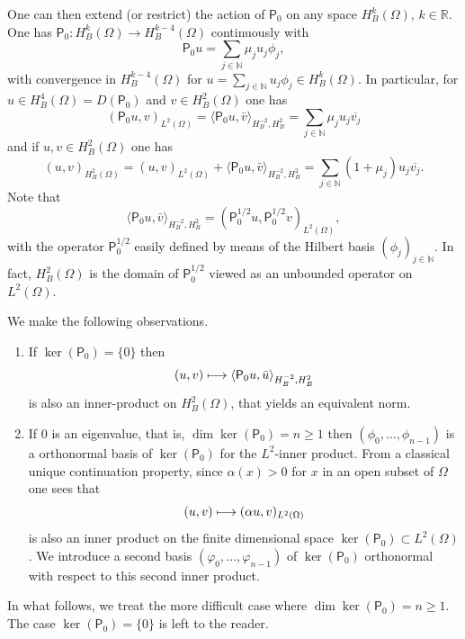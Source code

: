 \documentclass[10pt]{amsart}
\newcommand\mto{\mathchoice{\longmapsto}{\mapsto}{\mapsto}{\mapsto}}
\theoremstyle{plain}
\theoremstyle{definition}
\def\R{\mathbb{R}}
\def\N{\mathbb{N}}
\newcommand{\ovl}[1]{\overline{#1}}
\newcommand{\inp}[2]{(#1, #2)}
\newcommand{\dup}[2]{\langle #1 , #2 \rangle}
\newcommand{\Pell}{\mathsf P_0}
\begin{document}
One can then extend (or restrict) the action of $\Pell$ on any space
$H^k_B(\Omega)$, $k \in \R$. One has $\Pell: H^k_B(\Omega) \to
H^{k-4}_B(\Omega)$ continuously with
\begin{equation}
\label{eq: action P}
\Pell u = \sum_{j\in \N}\mu_j u_j \phi_j,
\end{equation}
with convergence in $H^{k-4}_B(\Omega)$ for $u = \sum_{j\in \N}u_j \phi_j
\in H^k_B(\Omega)$.
In particular, for $u \in H^4_B(\Omega)= D(\Pell)$ and $v \in H^{2}_B(\Omega)$
one has
\begin{equation}
\label{eq: pseudo-norm}
\inp{\Pell u }{v}_{L^2(\Omega)} = \dup{\Pell u }{\bar{v}}_{H^{-2}_B,
H^{2}_B}
= \sum_{j \in \N} \mu_j u_j \ovl{v_j}
\end{equation}
and if $u,v \in H^{2}_B(\Omega)$ one has
\begin{equation}
\label{eq: norm H2B}
\inp{u}{v}_{H^{2}_B(\Omega)} = \inp{u }{v}_{L^2(\Omega)}
+ \dup{\Pell u }{\bar{v}}_{H^{-2}_B, H^{2}_B}
= \sum_{j \in \N} (1+\mu_j) u_j \ovl{v_j}.
\end{equation}
Note that
\begin{equation}
\label{eq: norm H2B-bis}
\dup{\Pell u }{\bar{v}}_{H^{-2}_B, H^{2}_B}
= \inp{\Pell^{1/2} u}{\Pell^{1/2} v}_{L^2(\Omega)},
\end{equation}
with the operator $\Pell^{1/2}$ easily defined by means of the Hilbert
basis $(\phi_j)_{j \in \N}$. In fact, $H^{2}_B(\Omega)$ is the domain
of $\Pell^{1/2}$ viewed as an unbounded operator on $L^2(\Omega)$.

We make the following observations.
\begin{enumerate}
\item
If $\ker (\Pell) = \{0\}$ then
\begin{equation*}
(u,v) \mto \dup{\Pell u }{\bar{u}}_{H^{-2}_B, H^{2}_B}
\end{equation*}
is also an inner-product on $H^{2}_B(\Omega)$, that yields an
equivalent norm.

\item
If $0$ is an eigenvalue, that is,
$\dim \ker(\Pell)= n\geq 1$ then $(\phi_0, \dots, \phi_{n-1})$ is a
orthonormal basis of $\ker(\Pell)$ for the $L^2$-inner product.
From a classical unique continuation
property, since $\alpha(x) >0$ for $x$ in an open subset of $\Omega$ one sees that
\begin{equation}
\label{eq: second inner product ker P}
(u,v) \mto \inp{\alpha u}{v}_{L^2(\Omega)}
\end{equation} is also an inner product on
the finite dimensional space $\ker(\Pell) \subset L^2(\Omega)$.
We introduce a second basis $(\varphi_0, \dots, \varphi_{n-1})$ of $\ker(\Pell)$ orthonormal with respect to this second
inner product.
\end{enumerate}
In what follows, we treat the more difficult case where $\dim
\ker(\Pell)= n\geq 1$. The case $\ker (\Pell)=\{0\}$ is left to the
reader.
\end{document}
